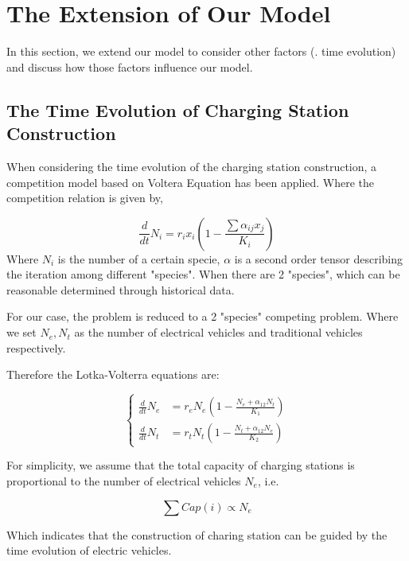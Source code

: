 \section{The Extension of Our Model}
\label{sec_extension}
In this section, we extend our model to consider other factors (\eg. time evolution) and discuss how those factors influence our model.

\subsection{The Time Evolution of Charging Station Construction}
\label{time}
When considering the time evolution of the charging station construction, a competition model based on Voltera Equation has been applied. Where the competition relation is given by,

\begin{equation}
\label{competition}
  \frac{d}{dt} N_i = r_i x_i ( 1- \frac{\sum \alpha_{ij}x_j}{K_i})
\end{equation}
Where $N_i$ is the number of a certain specie, $\alpha$ is a second order tensor describing the iteration among different "species". When there are 2 "species", which can be reasonable determined through historical data.

For our case, the problem is reduced to a 2 "species" competing problem. Where we set $N_e,N_t$ as the number of electrical vehicles and traditional vehicles respectively.

Therefore the Lotka-Volterra equations are:

\begin{equation}
\label{competition_2}
\left\{
       \begin{array}{lr}
             \frac{d}{dt} N_e & = r_e N_e ( 1- \frac{N_e+\alpha_{12}N_t}{K_1})\\
             \frac{d}{dt} N_t & = r_t N_t ( 1- \frac{N_t+\alpha_{12}N_e}{K_2})
       \end{array}
\right.
\end{equation}



For simplicity, we assume that the total capacity of charging stations is proportional to the number of electrical vehicles $N_e$, i.e.

\begin{equation}
\label{propor}
  \sum Cap(i) \varpropto N_e
\end{equation}

Which indicates that the construction of charing station can be guided by the time evolution of electric vehicles.


